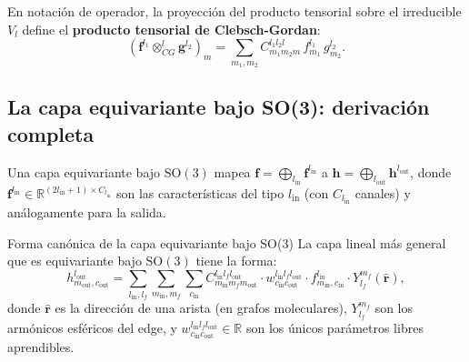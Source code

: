 En notación de operador, la proyección del producto tensorial sobre el irreducible
$V_l$ define el \textbf{producto tensorial de Clebsch-Gordan}:
\[
  (\bm{f}^{l_1} \otimes_{CG}^l \bm{g}^{l_2})_m
  = \sum_{m_1, m_2} C_{m_1 m_2 m}^{l_1 l_2 l}\,
  f_{m_1}^{l_1}\,g_{m_2}^{l_2}.
\]

\subsection{La capa equivariante bajo SO(3): derivación completa}
\label{subsec:so3_layer}

Una capa equivariante bajo $\mathrm{SO}(3)$ mapea
$\bm{f} = \bigoplus_{l_{\mathrm{in}}} \bm{f}^{l_{\mathrm{in}}}$ a
$\bm{h} = \bigoplus_{l_{\mathrm{out}}} \bm{h}^{l_{\mathrm{out}}}$,
donde $\bm{f}^{l_{\mathrm{in}}} \in \mathbb{R}^{(2l_{\mathrm{in}}+1)\times C_{l_{\mathrm{in}}}}$
son las características del tipo $l_{\mathrm{in}}$ (con $C_{l_{\mathrm{in}}}$
canales) y análogamente para la salida.

\begin{teorema}{Forma canónica de la capa equivariante bajo SO(3)}
\label{thm:so3_layer}
La capa lineal más general que es equivariante bajo $\mathrm{SO}(3)$ tiene la
forma:
\begin{equation}
  h_{m_{\mathrm{out}}, c_{\mathrm{out}}}^{l_{\mathrm{out}}}
  = \sum_{l_{\mathrm{in}}, l_f} \sum_{m_{\mathrm{in}}, m_f}
  \sum_{c_{\mathrm{in}}}
  C_{m_{\mathrm{in}} m_f m_{\mathrm{out}}}^{l_{\mathrm{in}} l_f l_{\mathrm{out}}}
  \cdot w_{c_{\mathrm{in}} c_{\mathrm{out}}}^{l_{\mathrm{in}} l_f l_{\mathrm{out}}}
  \cdot f_{m_{\mathrm{in}}, c_{\mathrm{in}}}^{l_{\mathrm{in}}}
  \cdot Y_{l_f}^{m_f}(\hat{\bm{r}}),
  \label{eq:so3_layer}
\end{equation}
donde $\hat{\bm{r}}$ es la dirección de una arista (en grafos moleculares),
$Y_{l_f}^{m_f}$ son los armónicos esféricos del edge, y $w_{c_{\mathrm{in}}
c_{\mathrm{out}}}^{l_{\mathrm{in}} l_f l_{\mathrm{out}}} \in \mathbb{R}$ son
los únicos parámetros libres aprendibles.
\end{teorema}

